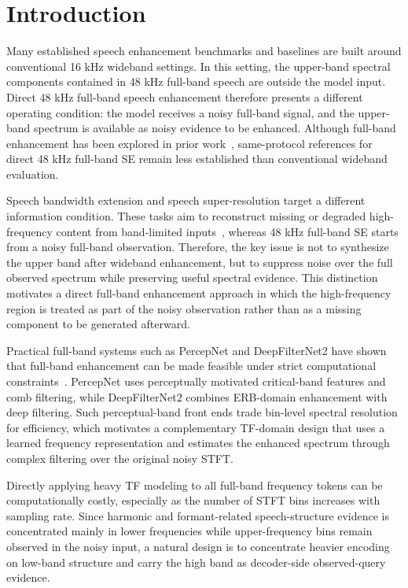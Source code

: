 \chapter{Introduction}
\label{chap:introduction}

Many established speech enhancement benchmarks and baselines are built around conventional 16 kHz wideband settings. In this setting, the upper-band spectral components contained in 48 kHz full-band speech are outside the model input. Direct 48 kHz full-band speech enhancement therefore presents a different operating condition: the model receives a noisy full-band signal, and the upper-band spectrum is available as noisy evidence to be enhanced. Although full-band enhancement has been explored in prior work~\cite{valin2020percepnet,schroter2022deepfilternet,zhao2022frcrn,yu2022dmfnet}, same-protocol references for direct 48 kHz full-band SE remain less established than conventional wideband evaluation.

Speech bandwidth extension and speech super-resolution target a different information condition. These tasks aim to reconstruct missing or degraded high-frequency content from band-limited inputs~\cite{liu2022voicefixer,andreev2022hifiplusplus}, whereas 48 kHz full-band SE starts from a noisy full-band observation. Therefore, the key issue is not to synthesize the upper band after wideband enhancement, but to suppress noise over the full observed spectrum while preserving useful spectral evidence. This distinction motivates a direct full-band enhancement approach in which the high-frequency region is treated as part of the noisy observation rather than as a missing component to be generated afterward.

Practical full-band systems such as PercepNet and DeepFilterNet2 have shown that full-band enhancement can be made feasible under strict computational constraints~\cite{valin2020percepnet,schroter2022deepfilternet2}. PercepNet uses perceptually motivated critical-band features and comb filtering, while DeepFilterNet2 combines ERB-domain enhancement with deep filtering. Such perceptual-band front ends trade bin-level spectral resolution for efficiency, which motivates a complementary TF-domain design that uses a learned frequency representation and estimates the enhanced spectrum through complex filtering over the original noisy STFT.

Directly applying heavy TF modeling to all full-band frequency tokens can be computationally costly, especially as the number of STFT bins increases with sampling rate. Since harmonic and formant-related speech-structure evidence is concentrated mainly in lower frequencies while upper-frequency bins remain observed in the noisy input, a natural design is to concentrate heavier encoding on low-band structure and carry the high band as decoder-side observed-query evidence.

